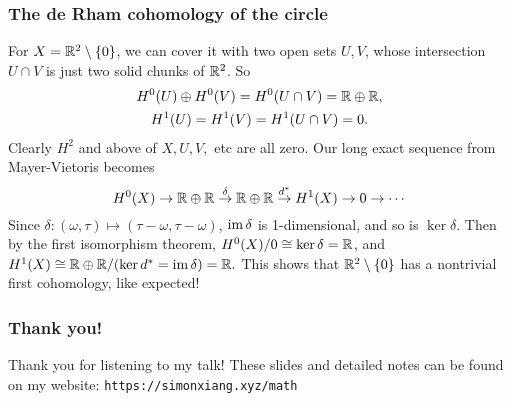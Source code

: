 \documentclass[xcolor=dvipsnames]{beamer}
\begin{document}
\begin{frame}
    \frametitle{The de Rham cohomology of the circle} 
    \begin{example}
        For $X=\mathbb{R}^2 \setminus \{0\} $, we can cover it with two open sets $U ,V$, whose intersection $U \cap V$ is just two solid chunks of $\mathbb{R}^2$. So 
        \begin{gather*}
        H^0(U)\oplus H^0(V)=H^0(U\cap V)=\mathbb{R}\oplus \mathbb{R}, \\ H^1(U)=H^1(V)=H^1(U\cap V)=0.
        \end{gather*}
        Clearly $H^2$ and above of $X,U,V,$ etc are all zero. Our long exact sequence from Mayer-Vietoris becomes \[
            H^0(X)\to \mathbb{R}\oplus \mathbb{R} \overset{\delta }{\to}  \mathbb{R}\oplus \mathbb{R} \overset{d^*}{\to } H^1(X)\to 0\to \cdots 
        \] Since $\delta  \colon (\omega,\tau) \mapsto (\tau-\omega,\tau-\omega)$, $\operatorname{im} \delta $ is 1-dimensional, and so is $\ker \delta $. Then by the first isomorphism theorem, $H^0(X) /0\cong\ker \delta  =\mathbb{R}$, and $H^1(X)\cong \mathbb{R}\oplus \mathbb{R} / (\ker d^*=\operatorname{im} \delta )=\mathbb{R}.$ This shows that $\mathbb{R}^2\setminus \{0\} $ has a nontrivial first cohomology, like expected!
    \end{example}
\end{frame}
\endgroup


\begin{frame}
    \frametitle{Thank you!} 
Thank you for listening to my talk! These slides and detailed notes can be found on my website: \texttt{https://simonxiang.xyz/math} 
\end{frame}
\end{document}
